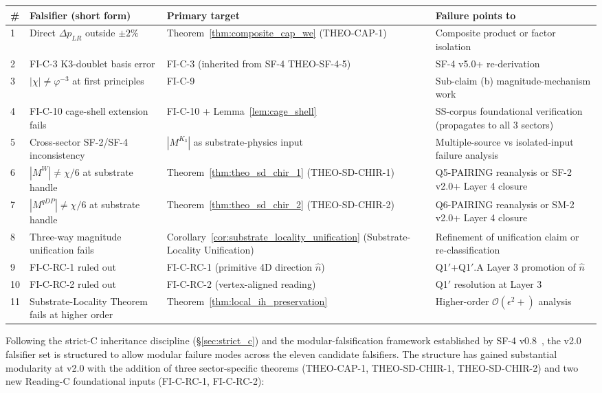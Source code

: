 \documentclass[11pt,letterpaper]{article}
\newcommand{\phig}{\varphi}
\newcommand{\Kthree}{\ensuremath{K_3}}
\newcommand{\DeltapLR}{\Delta p_{LR}}
\begin{document}
\begin{center}\small
\begin{tabular}{p{0.4cm}p{4.5cm}p{4.2cm}p{4.5cm}}
\toprule
\# & Falsifier (short form) & Primary target & Failure points to \\
\midrule
1 & Direct $\DeltapLR$ outside $\pm 2\%$ & Theorem~\ref{thm:composite_cap_we} (THEO-CAP-1) & Composite product or factor isolation \\
2 & FI-C-3 K3-doublet basis error & FI-C-3 (inherited from SF-4 THEO-SF-4-5) & SF-4 v5.0+ re-derivation \\
3 & $|\chi| \neq \phig^{-3}$ at first principles & FI-C-9 & Sub-claim (b) magnitude-mechanism work \\
4 & FI-C-10 cage-shell extension fails & FI-C-10 + Lemma~\ref{lem:cage_shell} & SS-corpus foundational verification (propagates to all 3 sectors) \\
5 & Cross-sector SF-2/SF-4 inconsistency & $|M^{\Kthree}|$ as substrate-physics input & Multiple-source vs isolated-input failure analysis \\
6 & $|M^W| \neq \chi/6$ at substrate handle & Theorem~\ref{thm:theo_sd_chir_1} (THEO-SD-CHIR-1) & Q5-PAIRING reanalysis or SF-2 v2.0+ Layer 4 closure \\
7 & $|M^{qDP}| \neq \chi/6$ at substrate handle & Theorem~\ref{thm:theo_sd_chir_2} (THEO-SD-CHIR-2) & Q6-PAIRING reanalysis or SM-2 v2.0+ Layer 4 closure \\
8 & Three-way magnitude unification fails & Corollary~\ref{cor:substrate_locality_unification} (Substrate-Locality Unification) & Refinement of unification claim or re-classification \\
9 & FI-C-RC-1 ruled out & FI-C-RC-1 (primitive 4D direction $\hat{n}$) & Q1$'$+Q1$'$.A Layer 3 promotion of $\hat{n}$ \\
10 & FI-C-RC-2 ruled out & FI-C-RC-2 (vertex-aligned reading) & Q1$'$ resolution at Layer 3 \\
11 & Substrate-Locality Theorem fails at higher order & Theorem~\ref{thm:local_ih_preservation} & Higher-order $\mathcal{O}(\epsilon^2+)$ analysis \\
\bottomrule
\end{tabular}
\end{center}

\bigskip

Following the strict-C inheritance discipline (\S\ref{sec:strict_c}) and the modular-falsification framework established by SF-4 v0.8~\cite{abshier_sf4}, the v2.0 falsifier set is structured to allow modular failure modes across the eleven candidate falsifiers. The structure has gained substantial modularity at v2.0 with the addition of three sector-specific theorems (THEO-CAP-1, THEO-SD-CHIR-1, THEO-SD-CHIR-2) and two new Reading-C foundational inputs (FI-C-RC-1, FI-C-RC-2):
\end{document}
